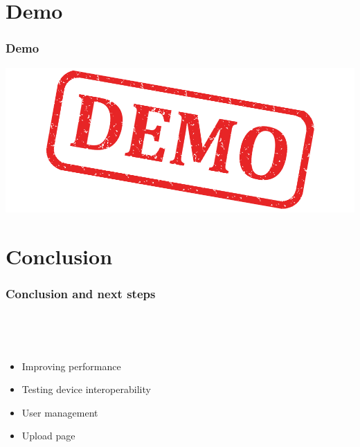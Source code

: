 \section{Demo}

\begin{frame}
  \frametitle{Demo}
  \includegraphics[width=\textwidth]{images/demo}
\end{frame}

\section{Conclusion}

\begin{frame}
  \frametitle{Conclusion and next steps}
  \begin{description}[]
    \item[Conclusion] \hfill \\
    \item[Next Steps] \hfill \\
      \begin{itemize}
        \item Improving performance
        \item Testing device interoperability
        \item User management
        \item Upload page
      \end{itemize}
  \end{description} 
\end{frame}


